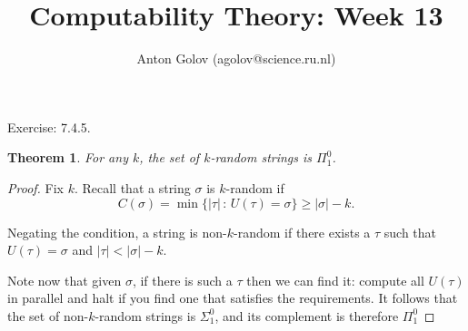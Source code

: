 \documentclass{article}
\title{Computability Theory: Week 13}
\author{Anton Golov (agolov@science.ru.nl)}
\newtheorem{theorem}{Theorem}
\newcommand{\compr}[2]{\{ #1 \,:\, #2 \}}
\begin{document}
  \maketitle

  Exercise: 7.4.5.

  \begin{theorem}
    For any $k$, the set of $k$-random strings is $\Pi^0_1$.
  \end{theorem}

  \begin{proof}
    Fix $k$.  Recall that a string $\sigma$ is $k$-random if \[ C(\sigma) = \min\compr{|\tau|}{U(\tau) = \sigma} \ge
    |\sigma| - k. \]

    Negating the condition, a string is non-$k$-random if there exists a $\tau$ such that $U(\tau) =
    \sigma$ and $|\tau| < |\sigma| - k$.

    Note now that given $\sigma$, if there is such a $\tau$ then we can find it: compute all $U(\tau)$ in parallel and
    halt if you find one that satisfies the requirements.  It follows that the set of non-$k$-random strings is
    $\Sigma^0_1$, and its complement is therefore $\Pi^0_1$
  \end{proof}
\end{document}
